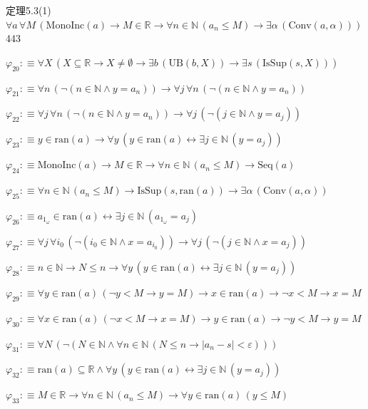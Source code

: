\begin{fullproof}{定理5.3(1)}{$\forall a\,\forall M\,(\mathrm{MonoInc}(a) \to M \in \mathbb{R} \to \forall n \in \mathbb{N}\,(a_{n} \leq M) \to \exists \alpha\,(\mathrm{Conv}(a,\alpha)))$}{443}
\begin{abbrevlist}
\item $\varphi_{20} :\equiv \forall X\,(X \subseteq \mathbb{R} \to X \neq \emptyset \to \exists b\,(\mathrm{UB}(b,X)) \to \exists s\,(\mathrm{IsSup}(s,X)))$
\item $\varphi_{21} :\equiv \forall n\,(\neg (n \in \mathbb{N} \land y = a_{n})) \to \forall j\,\forall n\,(\neg (n \in \mathbb{N} \land y = a_{n}))$
\item $\varphi_{22} :\equiv \forall j\,\forall n\,(\neg (n \in \mathbb{N} \land y = a_{n})) \to \forall j\,(\neg (j \in \mathbb{N} \land y = a_{j}))$
\item $\varphi_{23} :\equiv y \in \mathrm{ran}(a) \to \forall y\,(y \in \mathrm{ran}(a) \leftrightarrow \exists j \in \mathbb{N}\,(y = a_{j}))$
\item $\varphi_{24} :\equiv \mathrm{MonoInc}(a) \to M \in \mathbb{R} \to \forall n \in \mathbb{N}\,(a_{n} \leq M) \to \mathrm{Seq}(a)$
\item $\varphi_{25} :\equiv \forall n \in \mathbb{N}\,(a_{n} \leq M) \to \mathrm{IsSup}(s,\mathrm{ran}(a)) \to \exists \alpha\,(\mathrm{Conv}(a,\alpha))$
\item $\varphi_{26} :\equiv a_{1_{\omega}} \in \mathrm{ran}(a) \leftrightarrow \exists j \in \mathbb{N}\,(a_{1_{\omega}} = a_{j})$
\item $\varphi_{27} :\equiv \forall j\,\forall i_{0}\,(\neg (i_{0} \in \mathbb{N} \land x = a_{i_{0}})) \to \forall j\,(\neg (j \in \mathbb{N} \land x = a_{j}))$
\item $\varphi_{28} :\equiv n \in \mathbb{N} \to N \leq n \to \forall y\,(y \in \mathrm{ran}(a) \leftrightarrow \exists j \in \mathbb{N}\,(y = a_{j}))$
\item $\varphi_{29} :\equiv \forall y \in \mathrm{ran}(a)\,(\neg y < M \to y = M) \to x \in \mathrm{ran}(a) \to \neg x < M \to x = M$
\item $\varphi_{30} :\equiv \forall x \in \mathrm{ran}(a)\,(\neg x < M \to x = M) \to y \in \mathrm{ran}(a) \to \neg y < M \to y = M$
\item $\varphi_{31} :\equiv \forall N\,(\neg (N \in \mathbb{N} \land \forall n \in \mathbb{N}\,(N \leq n \to \lvert a_{n} - s \rvert < \varepsilon)))$
\item $\varphi_{32} :\equiv \mathrm{ran}(a) \subseteq \mathbb{R} \land \forall y\,(y \in \mathrm{ran}(a) \leftrightarrow \exists j \in \mathbb{N}\,(y = a_{j}))$
\item $\varphi_{33} :\equiv M \in \mathbb{R} \to \forall n \in \mathbb{N}\,(a_{n} \leq M) \to \forall y \in \mathrm{ran}(a)\,(y \leq M)$

\end{abbrevlist}
\end{fullproof}
